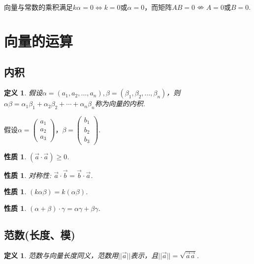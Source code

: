 \documentclass[12pt, a4paper, oneside]{ctexbook}
\newtheorem{definition}[theorem]{定义}
\newtheorem{quolity}[theorem]{性质}
\begin{document}
向量与常数的乘积满足$k\alpha = 0 \Leftrightarrow k = 0 \mbox{或} \alpha = 0$，而矩阵$AB=0 \nLeftrightarrow A=0 \mbox{或} B=0$. 

\section{向量的运算}

\subsection{内积}

\begin{definition}
    假设$\alpha = (a_1, a_2, \dots, a_n), \beta = (\beta_1, \beta_2, \dots, \beta_n)$，则$\alpha \beta = \alpha_1\beta_1 + \alpha_2\beta_2 + \cdots + \alpha_n\beta_n$称为向量的内积. 
\end{definition}

假设$\alpha = \begin{pmatrix}
    a_1 \\ a_2 \\ a_3
\end{pmatrix}$，$\beta = \begin{pmatrix}
    b_1 \\ b_2 \\ b_3
\end{pmatrix}$. 

\begin{quolity}
    $(\vec a \cdot \vec a) \ge 0$.
\end{quolity}

\begin{quolity}
    对称性: $\vec a \cdot \vec b = \vec b \cdot \vec a$. 
\end{quolity}

\begin{quolity}
    $(k\alpha\beta) = k(\alpha\beta)$. 
\end{quolity}

\begin{quolity}
    $(\alpha + \beta) \cdot \gamma = \alpha\gamma + \beta\gamma$. 
\end{quolity}

\subsection{范数(长度、模)}

\begin{definition}
    范数与向量长度同义，范数用$||\vec a||$表示，且$||\vec a|| = \sqrt{\vec a \vec a}$. 
\end{definition}
\end{document}
